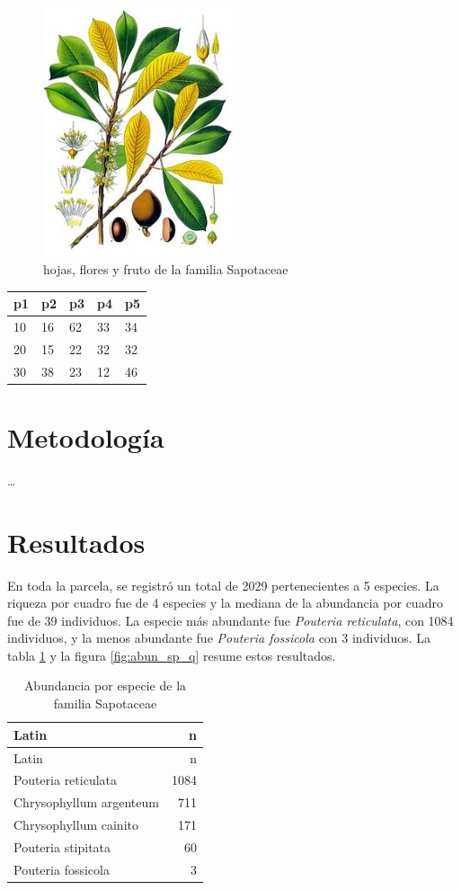 \documentclass[11pt,]{article}
\begin{document}
\begin{figure}
\centering
\includegraphics[width=0.50000\textwidth]{Sapotaceae.jpg}
\caption{hojas, flores y fruto de la familia Sapotaceae\label{imagen}}
\end{figure}

\begin{longtable}[]{@{}lllll@{}}
\toprule
p1 & p2 & p3 & p4 & p5\tabularnewline
\midrule
\endhead
10 & 16 & 62 & 33 & 34\tabularnewline
20 & 15 & 22 & 32 & 32\tabularnewline
30 & 38 & 23 & 12 & 46\tabularnewline
\bottomrule
\end{longtable}

\section{Metodología}\label{metodologuxeda}

\ldots

\section{Resultados}\label{resultados}

En toda la parcela, se registró un total de 2029 pertenecientes a 5
especies. La riqueza por cuadro fue de 4 especies y la mediana de la
abundancia por cuadro fue de 39 individuos. La especie más abundante fue
\emph{Pouteria reticulata}, con 1084 individuos, y la menos abundante
fue \emph{Pouteria fossicola} con 3 individuos. La tabla
\ref{tab:abun_sp} y la figura \ref{fig:abun_sp_q} resume estos
resultados.

\begin{longtable}[]{@{}lr@{}}
\caption{\label{tab:abun_sp}Abundancia por especie de la familia
Sapotaceae}\tabularnewline
\toprule
Latin & n\tabularnewline
\midrule
\endfirsthead
\toprule
Latin & n\tabularnewline
\midrule
\endhead
Pouteria reticulata & 1084\tabularnewline
Chrysophyllum argenteum & 711\tabularnewline
Chrysophyllum cainito & 171\tabularnewline
Pouteria stipitata & 60\tabularnewline
Pouteria fossicola & 3\tabularnewline
\bottomrule
\end{longtable}
\end{document}
